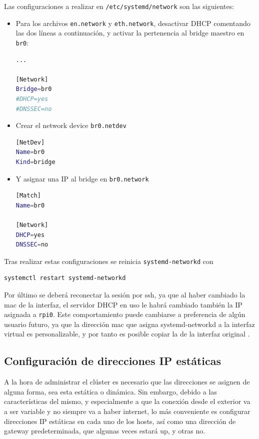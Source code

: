 Las configuraciones a realizar en \texttt{/etc/systemd/network} son las siguientes:

\begin{itemize}
    \item Para los archivos \texttt{en.network} y \texttt{eth.network}, desactivar DHCP comentando las dos líneas a continuación, y activar la pertenencia al bridge maestro en \texttt{br0}:
\begin{lstlisting}[language=bash]
...

[Network]
Bridge=br0
#DHCP=yes
#DNSSEC=no
\end{lstlisting}
    \item Crear el network device \texttt{br0.netdev}
\begin{lstlisting}[language=bash]
[NetDev]
Name=br0
Kind=bridge
\end{lstlisting}
    \item Y asignar una IP al bridge en \texttt{br0.network}
\begin{lstlisting}[language=bash]
[Match]
Name=br0

[Network]
DHCP=yes
DNSSEC=no
\end{lstlisting}
\end{itemize}

Tras realizar estas configuraciones se reinicia \texttt{systemd-networkd} con
\begin{lstlisting}[language=bash]
systemctl restart systemd-networkd
\end{lstlisting}

Por último se deberá reconectar la sesión por \acrshort{ssh}, ya que al haber cambiado la \acrshort{mac} de la interfaz, el servidor DHCP en uso le habrá cambiado también la IP asignada a \texttt{rpi0}. Este comportamiento puede cambiarse a preferencia de algún usuario futuro, ya que la dirección \acrshort{mac} que asigna systemd-networkd a la interfaz virtual es personalizable, y por tanto es posible copiar la de la interfaz original \cite[\textbf{Tip}: systemd-networkd assigns a MAC \footnotesize{\lbrack\ldots\rbrack}\normalsize{}]{archwiki_systemd-networkd}.

\subsection{Configuración de direcciones IP estáticas}
\label{ssec:configuracion_ip_estaticas}
A la hora de administrar el clúster es necesario que las direcciones se asignen de alguna forma, sea esta estática o dinámica. Sin embargo, debido a las características del mismo, y especialmente a que la conexión desde el exterior va a ser variable y no siempre va a haber internet, lo más conveniente es configurar direcciones IP estáticas en cada uno de los hosts, así como una dirección de gateway predeterminada, que algunas veces estará up, y otras no.

